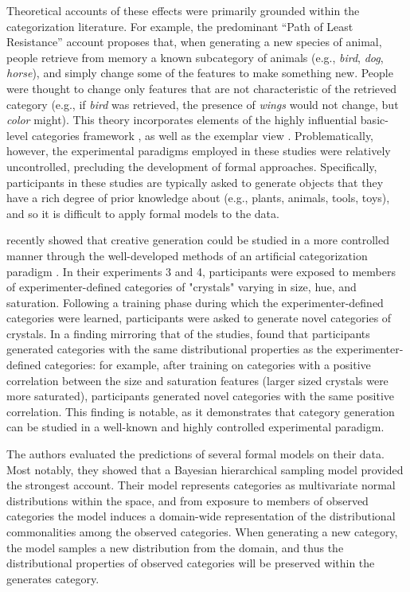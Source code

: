 \documentclass[12pt]{article}
\begin{document}
\begin{flushleft}
Theoretical accounts of these effects were primarily grounded within the categorization literature. For example, the predominant ``Path of Least Resistance'' account \citep[see][]{ward1994structured,ward1995s,ward2002role} proposes that, when generating a new species of animal, people retrieve from memory a known subcategory of animals (e.g., \textit{bird}, \textit{dog}, \textit{horse}), and simply change some of the features to make something new. People were thought to change only features that are not characteristic of the retrieved category (e.g., if \textit{bird} was retrieved, the presence of \textit{wings} would not change, but \textit{color} might). This theory incorporates elements of the highly influential basic-level categories framework \citep{rosch1975cognitive,rosch1976basic}, as well as the exemplar view \citep{medin1978context,nosofsky1984choice,nosofsky1986attention}. Problematically, however, the experimental paradigms employed in these studies were relatively uncontrolled, precluding the development of formal approaches. Specifically, participants in these studies are typically asked to generate objects that they have a rich degree of prior knowledge about (e.g., plants, animals, tools, toys), and so it is difficult to apply formal models to the data.

\cite{jern2013probabilistic} recently showed that creative generation could be studied in a more controlled manner through the well-developed methods of an artificial categorization paradigm \citep[see][]{kurtz2015human}. In their experiments 3 and 4, participants were exposed to members of experimenter-defined categories of "crystals" varying in size, hue, and saturation. Following a training phase during which the experimenter-defined categories were learned, participants were asked to generate novel categories of crystals. In a finding mirroring that of the \cite{ward1994structured} studies, \citeauthor{jern2013probabilistic} found that participants generated categories with the same distributional properties as the experimenter-defined categories: for example, after training on categories with a positive correlation between the size and saturation features (larger sized crystals were more saturated), participants generated novel categories with the same positive correlation. This finding is notable, as it demonstrates that category generation can be studied in a well-known and highly controlled experimental paradigm.

The authors evaluated the predictions of several formal models on their data. Most notably, they showed that a Bayesian hierarchical sampling model provided the strongest account. Their model represents categories as multivariate normal distributions within the space, and from exposure to members of observed categories the model induces a domain-wide representation of the distributional commonalities among the observed categories. When generating a new category, the model samples a new distribution from the domain, and thus the distributional properties of observed categories will be preserved within the generates category.


\end{flushleft}
\end{document}
